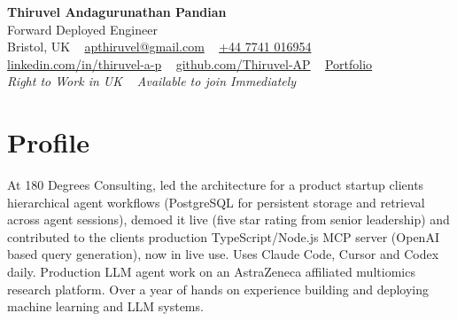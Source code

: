 \documentclass[a4paper,11pt]{article}
\begin{document}
\begin{center}
  {\fontsize{22}{26}\selectfont\bfseries\color{navy} Thiruvel Andagurunathan Pandian}\\[4pt]
  {\fontsize{12}{14}\selectfont\color{navy} Forward Deployed Engineer}\\[4pt]
  {\small
  Bristol, UK\nobreak\ \,\textperiodcentered\, \href{mailto:apthiruvel@gmail.com}{apthiruvel@gmail.com}\nobreak\ \,\textperiodcentered\, \href{tel:+447741016954}{+44 7741 016954}\nobreak\ \,\textperiodcentered\, \href{https://www.linkedin.com/in/thiruvel-a-p/}{linkedin.com/in/thiruvel-a-p}\nobreak\ \,\textperiodcentered\, \href{https://github.com/Thiruvel-AP}{github.com/Thiruvel-AP}\nobreak\ \,\textperiodcentered\, \href{https://thiruvel-ap.github.io/PersonalPortfolio/}{Portfolio}}\\[3pt]
  {\small\itshape\color{muted} Right to Work in UK\nobreak\ \,\textperiodcentered\, Available to join Immediately}

\end{center}

\section{Profile}
At 180 Degrees Consulting, led the architecture for a product startup client\textquotesingle{}s hierarchical agent workflows (PostgreSQL for persistent storage and retrieval across agent sessions), demoed it live (five star rating from senior leadership) and contributed to the client\textquotesingle{}s production TypeScript/Node.js MCP server (OpenAI based query generation), now in live use. Uses Claude Code, Cursor and Codex daily. Production LLM agent work on an AstraZeneca affiliated multiomics research platform. Over a year of hands on experience building and deploying machine learning and LLM systems.
\end{document}
